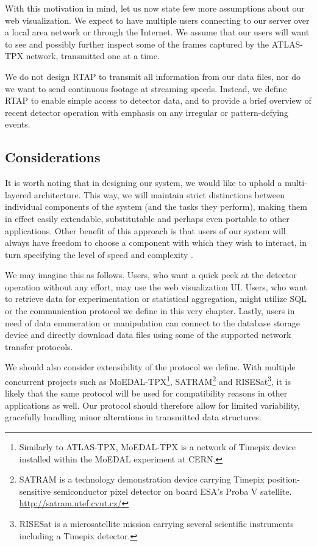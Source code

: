 With this motivation in mind, let us now state few more assumptions about our web visualization. We expect to have multiple users connecting to our server over a local area network or through the Internet. We assume that our users will want to see and possibly further inspect some of the frames captured by the ATLAS-TPX network, transmitted one at a time.

We do not design RTAP to transmit all information from our data files, nor do we want to send continuous footage at streaming speeds. Instead, we define RTAP to enable simple access to detector data, and to provide a brief overview of recent detector operation with emphasis on any irregular or pattern-defying events.

\subsection{Considerations}
It is worth noting that in designing our system, we would like to uphold a multi-layered architecture. This way, we will maintain strict distinctions between individual components of the system (and the tasks they perform), making them in effect easily extendable, substitutable and perhaps even portable to other applications. Other benefit of this approach is that users of our system will always have freedom to choose a component with which they wish to interact, in turn specifying the level of speed and complexity .

We may imagine this as follows. Users, who want a quick peek at the detector operation without any effort, may use the web visualization UI. Users, who want to retrieve data for experimentation or statistical aggregation, might utilize SQL or the communication protocol we define in this very chapter. Lastly, users in need of data enumeration or manipulation can connect to the database storage device and directly download data files using some of the supported network transfer protocols.

We should also consider extensibility of the protocol we define. With multiple concurrent projects such as MoEDAL-TPX\footnote{Similarly to ATLAS-TPX, MoEDAL-TPX is a network of Timepix device installed within the MoEDAL experiment at CERN.}, SATRAM\footnote{SATRAM is a technology demonstration device carrying Timepix position-sensitive semiconductor pixel detector on board ESA’s Proba V satellite. \url{http://satram.utef.cvut.cz/}} and RISESat\footnote{RISESat is a microsatellite mission carrying several scientific instruments including a Timepix detector.}, it is likely that the same protocol will be used for compatibility reasons in other applications as well. Our protocol should therefore allow for limited variability, gracefully handling minor alterations in transmitted data structures.

